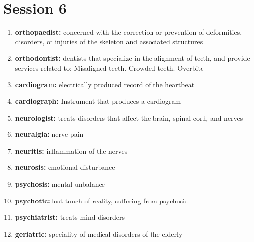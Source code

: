 \documentclass{article}
\begin{document}
\section{Session 6}
\begin{enumerate}
    \item \textbf{orthopaedist: }{concerned with the correction or prevention of deformities, disorders, or injuries of the skeleton and associated structures}
    \item \textbf{orthodontist: }{dentists that specialize in the alignment of teeth, and provide services related to: Misaligned teeth. Crowded teeth. Overbite}
    \item \textbf{cardiogram: }{electrically produced record of the heartbeat}
    \item \textbf{cardiograph: }{Instrument that produces a cardiogram}
    \item \textbf{neurologist: }{treats disorders that affect the brain, spinal cord, and nerves}
    \item \textbf{neuralgia: }{nerve pain}
    \item \textbf{neuritis: }{inflammation of the nerves}
    \item \textbf{neurosis: }{emotional disturbance}
    \item \textbf{psychosis: }{mental unbalance}
    \item \textbf{psychotic: }{lost touch of reality, suffering from psychosis}
    \item \textbf{psychiatrist: }{treats mind disorders}
    \item \textbf{geriatric: }{speciality of medical disorders of the elderly}
    
\end{enumerate}
\end{document}
